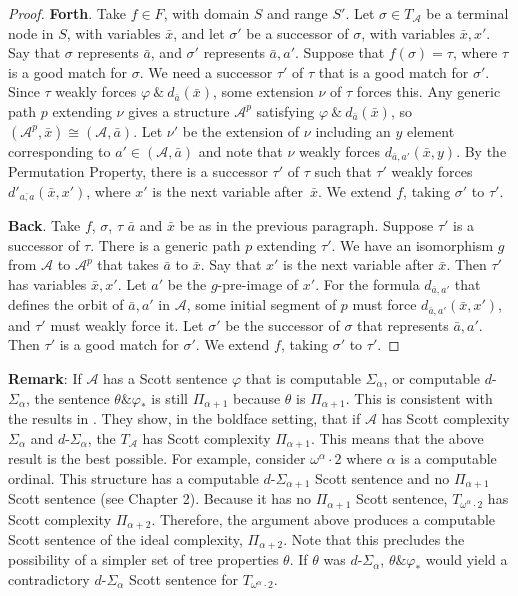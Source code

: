 \documentclass{article}
\begin{document}
\begin{proof}
\medskip
\noindent
\textbf{Forth}.  Take $f\in F$, with domain $S$ and range $S'$.  Let $\sigma\in T_\mathcal{A}$ be a terminal node in $S$, with variables $\bar{x}$, and let $\sigma'$ be a successor of $\sigma$, with variables $\bar{x},x'$.  Say that $\sigma$ represents $\bar{a}$, and $\sigma'$ represents $\bar{a},a'$.  Suppose that $f(\sigma) = \tau$, where $\tau$ is a good match for $\sigma$.  We need a successor $\tau'$ of $\tau$ that is a good match for $\sigma'$.  Since $\tau$ weakly forces $\varphi\ \&\ d_{\bar{a}}(\bar{x})$, some extension $\nu$ of $\tau$ forces this.  Any generic path $p$ extending $\nu$ gives a structure $\mathcal{A}^p$ satisfying $\varphi\ \&\ d_{\bar{a}}(\bar{x})$, so $(\mathcal{A}^p,\bar{x})\cong (\mathcal{A},\bar{a})$.  Let $\nu'$ be the extension of $\nu$ including an $y$ element corresponding to $a'\in(\mathcal{A},\bar{a})$ and note that $\nu$ weakly forces $d_{\bar{a},a'}(\bar{x},y)$.  
By the Permutation Property, there is a successor $\tau'$ of $\tau$ such that $\tau'$ weakly forces $d'_{\bar{a,a}}(\bar{x},x')$, where $x'$ is the next variable after~$\bar{x}$.  We extend $f$, taking $\sigma'$ to $\tau'$.     

\medskip
\noindent
\textbf{Back}.  Take $f$, $\sigma$, $\tau$ $\bar{a}$ and $\bar{x}$ be as in the previous paragraph.  Suppose $\tau'$ is a successor of $\tau$.  There is a generic path $p$ extending $\tau'$.  We have an isomorphism $g$ from $\mathcal{A}$ to $\mathcal{A}^p$ that takes $\bar{a}$ to $\bar{x}$.  Say that $x'$ is the next variable after $\bar{x}$.  Then $\tau'$ has variables $\bar{x},x'$.  Let $a'$ be the $g$-pre-image of $x'$.  For the formula $d_{\bar{a},a'}$ that defines the orbit of $\bar{a},a'$ in $\mathcal{A}$, some initial segment of $p$ must force $d_{\bar{a},a'}(\bar{x},x')$, and $\tau'$ must weakly force it.  Let $\sigma'$ be the successor of $\sigma$ that represents $\bar{a},a'$.  Then $\tau'$ is a good match for $\sigma'$.  We extend $f$, taking $\sigma'$ to $\tau'$.      
\end{proof}

\medskip
\noindent
\textbf{Remark}: If $\mathcal{A}$ has a Scott sentence $\varphi$ that is computable $\Sigma_\alpha$, or computable $d$-$\Sigma_\alpha$, the sentence $\theta \& \varphi_*$ is still $\Pi_{\alpha+1}$ because $\theta$ is $\Pi_{\alpha+1}$. This is consistent with the results in \cite{GR}. They show, in the boldface setting, that if $\mathcal{A}$ has Scott complexity  $\Sigma_\alpha$ and $d$-$\Sigma_\alpha$, the $T_\mathcal{A}$ has Scott complexity $\Pi_{\alpha+1}$. This means that the above result is the best possible. For example, consider $\omega^\alpha\cdot 2$ where $\alpha$ is a computable ordinal. This structure has a computable $d$-$\Sigma_{\alpha+1}$ Scott sentence and no $\Pi_{\alpha+1}$ Scott sentence (see \cite{Mbook2} Chapter 2). Because it has no $\Pi_{\alpha+1}$ Scott sentence, $T_{\omega^\alpha\cdot 2}$ has Scott complexity $\Pi_{\alpha+2}$. Therefore, the argument above produces a computable Scott sentence of the ideal complexity, $\Pi_{\alpha+2}$. Note that this precludes the possibility of a simpler set of tree properties $\theta$. If $\theta$ was $d$-$\Sigma_\alpha$, $\theta\&\varphi_*$ would yield a contradictory $d$-$\Sigma_\alpha$ Scott sentence for $T_{\omega^\alpha\cdot 2}$.
\end{document}
